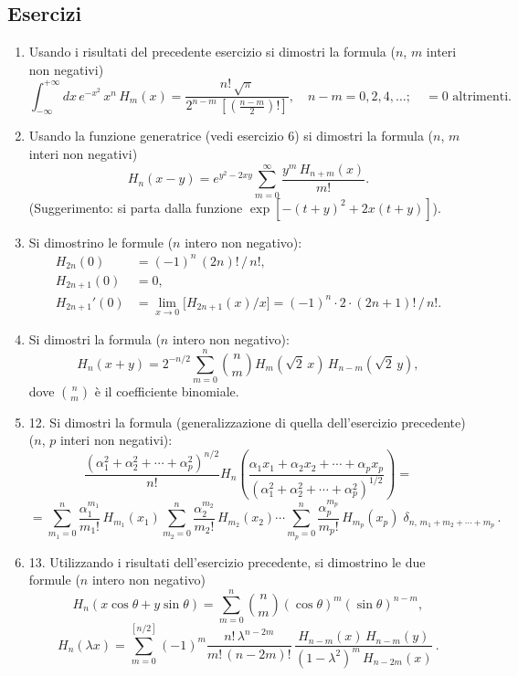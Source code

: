 \documentclass[11pt, a4paper]{book}
\numberwithin{equation}{section}
\newenvironment{esercizi}{\subsection*{Esercizi}\begin{enumerate}}{\end{enumerate}}
\begin{document}
\begin{esercizi}
\item Usando i risultati del precedente esercizio si dimostri la formula
($n$, $m$ interi non negativi)
\[
\int_{-\infty}^{+\infty} dx\,e^{-x^2}\,x^n\,H_m(x)
= \frac{n!\,\sqrt{\pi}}{2^{n-m}\,\left[\left(\frac{n-m}{2}\right)!\right]},
\quad n-m = 0,2,4,\ldots; \quad = 0 \text{ altrimenti}.
\]

\item[*] Usando la funzione generatrice (vedi esercizio 6) si dimostri
la formula ($n$, $m$ interi non negativi)
\[
H_n(x-y) = e^{y^2-2xy}\sum_{m=0}^{\infty} \frac{y^m\,H_{n+m}(x)}{m!}.
\]
(Suggerimento: si parta dalla funzione $\exp[-(t+y)^2 + 2x(t+y)]$).

\item Si dimostrino le formule ($n$ intero non negativo):
\begin{align*}
H_{2n}(0)     &= (-1)^n\,(2n)!\,/\,n!, \\
H_{2n+1}(0)  &= 0, \\
H_{2n+1}'(0) &= \lim_{x\to 0}\bigl[H_{2n+1}(x)/x\bigr]
               = (-1)^n\cdot 2\cdot(2n+1)!\,/\,n!.
\end{align*}

\item Si dimostri la formula ($n$ intero non negativo):
\[
H_n(x+y) = 2^{-n/2}\sum_{m=0}^{n}\binom{n}{m}H_m(\sqrt{2}\,x)\,
H_{n-m}(\sqrt{2}\,y),
\]
dove $\binom{n}{m}$ è il coefficiente binomiale.

\item[*] 12. Si dimostri la formula (generalizzazione di quella dell'esercizio precedente) ($n$, $p$ interi non negativi):
\[
\frac{\left(\alpha_1^2+\alpha_2^2+\cdots+\alpha_p^2\right)^{n/2}}{n!}
H_n\!\left(\frac{\alpha_1 x_1+\alpha_2 x_2+\cdots+\alpha_p x_p}{\left(\alpha_1^2+\alpha_2^2+\cdots+\alpha_p^2\right)^{1/2}}\right)=
\]
\[
=\sum_{m_1=0}^{n}\frac{\alpha_1^{m_1}}{m_1!}\,H_{m_1}(x_1)
\sum_{m_2=0}^{n}\frac{\alpha_2^{m_2}}{m_2!}\,H_{m_2}(x_2)\cdots
\sum_{m_p=0}^{n}\frac{\alpha_p^{m_p}}{m_p!}\,H_{m_p}(x_p)\;
\delta_{n,\,m_1+m_2+\cdots+m_p}\,.
\]

\item 13. Utilizzando i risultati dell'esercizio precedente, si dimostrino le due formule ($n$ intero non negativo)
\[
H_n(x\cos\theta + y\sin\theta)
= \sum_{m=0}^{n}\binom{n}{m}(\cos\theta)^m(\sin\theta)^{n-m},
\]
\[
H_n(\lambda x)=\sum_{m=0}^{[n/2]}(-1)^m
\frac{n!\,\lambda^{n-2m}}{m!\,(n-2m)!}\,
\frac{H_{n-m}(x)\,H_{n-m}(y)}{(1-\lambda^2)^m\,H_{n-2m}(x)}\,.
\]

\end{esercizi}
\end{document}
